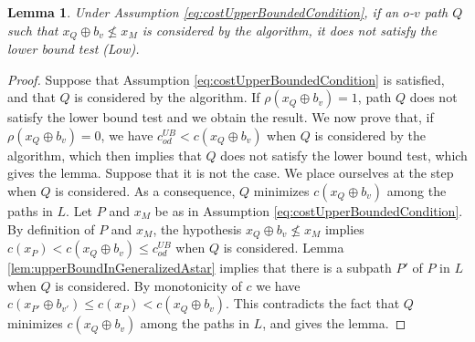 \documentclass[11pt]{amsart}
\theoremstyle{plain}
\newtheorem{lem}[theo]{Lemma}
\theoremstyle{remark}
\newcommand{\rplus}{\oplus}
\newcommand{\rleq}{\leqslant}
\newcommand{\nrleq}{\nleqslant}
\newcommand{\rcost}{c}
\newcommand{\rmeas}{\rho}
\newcommand{\re}{x}
\begin{document}
\begin{lem}\label{lem:pathsNotBoundedByQm}
Under Assumption \eqref{eq:costUpperBoundedCondition}, if an $o$-$v$ path $Q$ such that $\re_{Q}\rplus b_{v} \nrleq \re_{M}$ is considered by the algorithm, it does not satisfy the lower bound test (Low).
\end{lem}
\begin{proof}


Suppose that Assumption \eqref{eq:costUpperBoundedCondition} is satisfied, and that $Q$ is considered by the algorithm. If $\rmeas(\re_{Q}\rplus b_{v}) = 1$, path $Q$ does not satisfy the lower bound test and we obtain the result. We now prove that, if $\rmeas(\re_{Q}\rplus b_{v}) = 0$, we have $c_{od}^{UB} < c(\re_{Q} \rplus b_{v})$ when $Q$ is considered by the algorithm, which then implies that $Q$ does not satisfy the lower bound test, which gives the lemma. Suppose that it is not the case. We place ourselves at the step when $Q$ is considered. As a consequence, $Q$ minimizes $\rcost(\re_{Q} \rplus b_{v})$ among the paths in $L$. Let $P$ and $\re_{M}$ be as in Assumption \eqref{eq:costUpperBoundedCondition}. By definition of $P$ and $\re_{M}$, the hypothesis $\re_{Q}\rplus b_{v} \nrleq \re_{M}$ implies $c(\re_{P}) < c(\re_{Q} \rplus b_{v}) \leq c_{od}^{UB}$ when $Q$ is considered. Lemma \ref{lem:upperBoundInGeneralizedAstar} implies that there is a subpath $P'$ of $P$ in $L$ when $Q$ is considered. By monotonicity of $c$ we have $\rcost(\re_{P'} \rplus b_{v'}) \rleq \rcost(\re_{P}) < \rcost(\re_{Q} \rplus b_{v})$. This contradicts the fact that $Q$ minimizes $\rcost(\re_{Q} \rplus b_{v})$ among the paths in $L$, and gives the lemma.
\end{proof}
\end{document}
